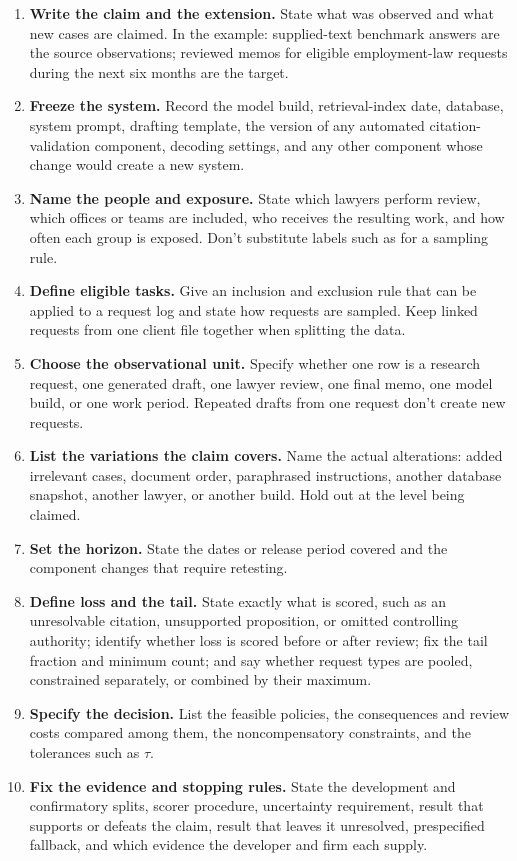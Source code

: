 \documentclass[12pt]{article}
\begin{document}
\begin{enumerate}
\item \textbf{Write the claim and the extension.} State what was observed and what new cases are claimed. In the example: supplied-text benchmark answers are the source observations; reviewed memos for eligible employment-law requests during the next six months are the target.
\item \textbf{Freeze the system.} Record the model build, retrieval-index date, database, system prompt, drafting template, the version of any automated citation-validation component, decoding settings, and any other component whose change would create a new system.
\item \textbf{Name the people and exposure.} State which lawyers perform review, which offices or teams are included, who receives the resulting work, and how often each group is exposed. Don't substitute labels such as  for a sampling rule.
\item \textbf{Define eligible tasks.} Give an inclusion and exclusion rule that can be applied to a request log and state how requests are sampled. Keep linked requests from one client file together when splitting the data.
\item \textbf{Choose the observational unit.} Specify whether one row is a research request, one generated draft, one lawyer review, one final memo, one model build, or one work period. Repeated drafts from one request don't create new requests.
\item \textbf{List the variations the claim covers.} Name the actual alterations: added irrelevant cases, document order, paraphrased instructions, another database snapshot, another lawyer, or another build. Hold out at the level being claimed.
\item \textbf{Set the horizon.} State the dates or release period covered and the component changes that require retesting.
\item \textbf{Define loss and the tail.} State exactly what is scored, such as an unresolvable citation, unsupported proposition, or omitted controlling authority; identify whether loss is scored before or after review; fix the tail fraction and minimum count; and say whether request types are pooled, constrained separately, or combined by their maximum.
\item \textbf{Specify the decision.} List the feasible policies, the consequences and review costs compared among them, the noncompensatory constraints, and the tolerances such as \(\tau\).
\item \textbf{Fix the evidence and stopping rules.} State the development and confirmatory splits, scorer procedure, uncertainty requirement, result that supports or defeats the claim, result that leaves it unresolved, prespecified fallback, and which evidence the developer and firm each supply.
\end{enumerate}
\end{document}
